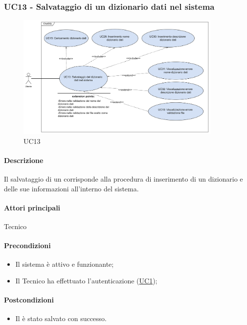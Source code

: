 \subsubsection{UC13 - Salvataggio di un dizionario dati nel sistema}\label{UC13}

\begin{figure}[H]
  \centering
  \includegraphics[width=0.90\textwidth]{assets/uc13.png}
  \caption{UC13}
\end{figure}

\paragraph*{Descrizione}
Il salvataggio di un  corrisponde alla procedura di inserimento di un dizionario e delle sue informazioni all'interno del sistema.

\paragraph*{Attori principali}
Tecnico

\paragraph*{Precondizioni}
\begin{itemize}
  \item Il sistema è attivo e funzionante;
  \item Il Tecnico ha effettuato l'autenticazione (\hyperref[UC1]{UC1});
\end{itemize}

\paragraph*{Postcondizioni}
\begin{itemize}
  \item Il  è stato salvato con successo.
\end{itemize}


